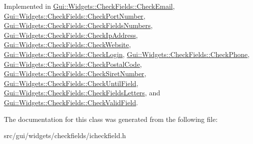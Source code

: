 Implemented in \hyperlink{classGui_1_1Widgets_1_1CheckFields_1_1CheckEmail_a166b7e7d39ca307a52477b2d9ef65ef1}{Gui\+::\+Widgets\+::\+Check\+Fields\+::\+Check\+Email}, \hyperlink{classGui_1_1Widgets_1_1CheckFields_1_1CheckPortNumber_aca2bfa31e06451c77a7a38020c2819b7}{Gui\+::\+Widgets\+::\+Check\+Fields\+::\+Check\+Port\+Number}, \hyperlink{classGui_1_1Widgets_1_1CheckFields_1_1CheckFieldsNumbers_ade88f674fc2cbbeb514cdf81c0f63487}{Gui\+::\+Widgets\+::\+Check\+Fields\+::\+Check\+Fields\+Numbers}, \hyperlink{classGui_1_1Widgets_1_1CheckFields_1_1CheckIpAddress_a785f3ccf0fba4db3e83bfaaaea37455e}{Gui\+::\+Widgets\+::\+Check\+Fields\+::\+Check\+Ip\+Address}, \hyperlink{classGui_1_1Widgets_1_1CheckFields_1_1CheckWebsite_ad2f5e53b88ca8740fd248dcaab0439bd}{Gui\+::\+Widgets\+::\+Check\+Fields\+::\+Check\+Website}, \hyperlink{classGui_1_1Widgets_1_1CheckFields_1_1CheckLogin_a66e6d426253b5219a55b7ccada37d9b9}{Gui\+::\+Widgets\+::\+Check\+Fields\+::\+Check\+Login}, \hyperlink{classGui_1_1Widgets_1_1CheckFields_1_1CheckPhone_a15e8da6b25e752c6fb816e6655bdb062}{Gui\+::\+Widgets\+::\+Check\+Fields\+::\+Check\+Phone}, \hyperlink{classGui_1_1Widgets_1_1CheckFields_1_1CheckPostalCode_a27abf247ec158aafb2c13779f6630449}{Gui\+::\+Widgets\+::\+Check\+Fields\+::\+Check\+Postal\+Code}, \hyperlink{classGui_1_1Widgets_1_1CheckFields_1_1CheckSiretNumber_a973f81b959d34b28818159303932f5f8}{Gui\+::\+Widgets\+::\+Check\+Fields\+::\+Check\+Siret\+Number}, \hyperlink{classGui_1_1Widgets_1_1CheckFields_1_1CheckUntilField_ad8d3923aa32bbcba0d73bb4240fe96e8}{Gui\+::\+Widgets\+::\+Check\+Fields\+::\+Check\+Until\+Field}, \hyperlink{classGui_1_1Widgets_1_1CheckFields_1_1CheckFieldsLetters_a95f6808ecc2cedf22407fc1791827851}{Gui\+::\+Widgets\+::\+Check\+Fields\+::\+Check\+Fields\+Letters}, and \hyperlink{classGui_1_1Widgets_1_1CheckFields_1_1CheckValidField_a871d7b28becd80aac9fc75a2057bb15d}{Gui\+::\+Widgets\+::\+Check\+Fields\+::\+Check\+Valid\+Field}.



The documentation for this class was generated from the following file\+:\begin{DoxyCompactItemize}
\item 
src/gui/widgets/checkfields/icheckfield.\+h\end{DoxyCompactItemize}
